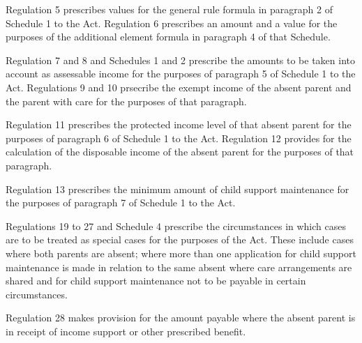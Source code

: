 \documentclass[a4paper]{article}
\begin{document}
Regulation 5 prescribes values for the general rule formula in paragraph 2 of Schedule 1 to the Act. Regulation 6 prescribes an amount and a value for the purposes of the additional element formula in paragraph 4 of that Schedule.

Regulation 7 and 8 and Schedules 1 and 2 prescribe the amounts to be taken into account as assessable income for the purposes of paragraph 5 of Schedule 1 to the Act. Regulations 9 and 10 prsecribe the exempt income of the absent parent and the parent with care for the purposes of that paragraph.

Regulation 11 prescribes the protected income level of that absent parent for the purposes of paragraph 6 of Schedule 1 to the Act. Regulation 12 provides for the calculation of the disposable income of the absent parent for the purposes of that paragraph.

Regulation 13 prescribes the minimum amount of child support maintenance for the purposes of paragraph 7 of Schedule 1 to the Act.

Regulations 19 to 27 and Schedule 4 prescribe the circumstances in which cases are to be treated as special cases for the purposes of the Act. These include cases where both parents are absent; where more than one application for child support maintenance is made in relation to the same absent where care arrangements are shared and for child support maintenance not to be payable in certain circumstances.

Regulation 28 makes provision for the amount payable where the absent parent is in receipt of income support or other prescribed benefit. 
\end{document}
